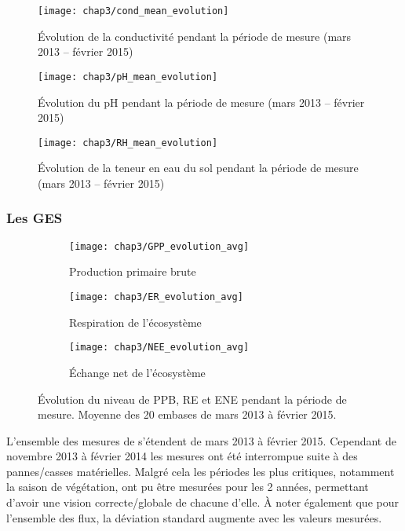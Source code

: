 \begin{figure}
\centering
\texttt{[image: chap3/cond\_mean\_evolution]}
\caption{Évolution de la conductivité pendant la période de mesure (mars 2013 -- février 2015)}
\label{fig:cond_mean_evolution}
\end{figure}

\begin{figure}
\centering
\texttt{[image: chap3/pH\_mean\_evolution]}
\caption{Évolution du pH pendant la période de mesure (mars 2013 -- février 2015)}
\label{fig:pH_mean_evolution}
\end{figure}


\begin{figure}
\centering
\texttt{[image: chap3/RH\_mean\_evolution]}
\caption{Évolution de la teneur en eau du sol pendant la période de mesure (mars 2013 -- février 2015)}
\label{fig:RH_mean_evolution}
\end{figure}
\subsubsection{Les GES}


\begin{figure}
	\centering
	\begin{subfigure}[t]{\textwidth}
		\centering
		\texttt{[image: chap3/GPP\_evolution\_avg]}
		\caption{Production primaire brute}
		\label{fig:GPP_evolution_avg}
	\end{subfigure}%
	
	\begin{subfigure}[t]{\textwidth}
		\centering
		\texttt{[image: chap3/ER\_evolution\_avg]}
		\caption{Respiration de l'écosystème}
		\label{fig:ER_evolution_avg}
	\end{subfigure}
	
	\begin{subfigure}[t]{\textwidth}
		\centering
		\texttt{[image: chap3/NEE\_evolution\_avg]}
		\caption{Échange net de l'écosystème}
		\label{fig:NEE_evolution_avg}
	\end{subfigure}
\caption{Évolution du niveau de PPB, RE et ENE pendant la période de mesure. Moyenne des 20 embases de mars 2013 à février 2015.}
\label{fig:flux_evolution_avg}
\end{figure}

L'ensemble des mesures de \coo s'étendent de mars 2013 à février 2015.
Cependant de novembre 2013 à février 2014 les mesures ont été interrompue suite à des pannes/casses matérielles.
Malgré cela les périodes les plus critiques, notamment la saison de végétation, ont pu être mesurées pour les 2 années, permettant d'avoir une vision correcte/globale de chacune d'elle.
À noter également que pour l'ensemble des flux, la déviation standard augmente avec les valeurs mesurées.

